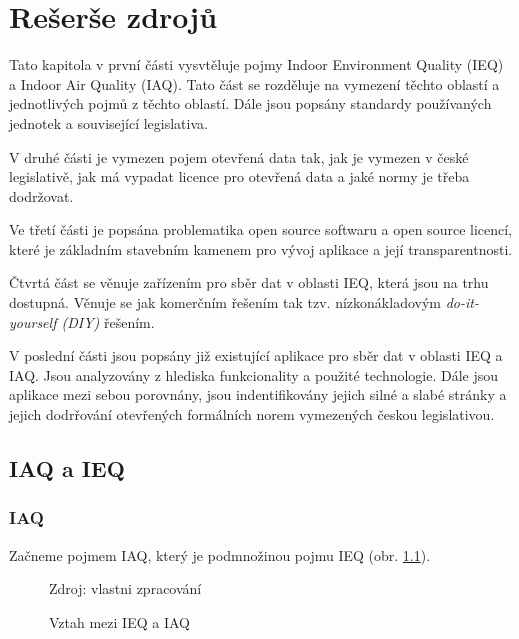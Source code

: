\chapter{Rešerše zdrojů}

Tato kapitola v první části vysvtěluje pojmy Indoor Environment Quality (IEQ) a Indoor Air Quality (IAQ). Tato část se rozděluje na vymezení těchto oblastí a jednotlivých pojmů z těchto oblastí. Dále jsou popsány standardy používaných jednotek a související legislativa. 

V druhé části je vymezen pojem otevřená data tak, jak je vymezen v české legislativě, jak má vypadat licence pro otevřená data a jaké normy je třeba dodržovat.

Ve třetí části je popsána problematika open source softwaru a open source licencí, které je základním stavebním kamenem pro vývoj aplikace a její transparentnosti.

Čtvrtá část se věnuje zařízením pro sběr dat v oblasti IEQ, která jsou na trhu dostupná. Věnuje se jak komerčním řešením tak tzv. nízkonákladovým \textit{do-it-yourself (DIY)} řešením.

V poslední části jsou popsány již existující aplikace pro sběr dat v oblasti IEQ a IAQ.
Jsou analyzovány z hlediska funkcionality a použité technologie. Dále jsou aplikace mezi sebou porovnány, jsou indentifikovány jejich silné a slabé stránky a jejich dodrřování otevřených formálních norem vymezených českou legislativou.  

\section{IAQ a IEQ}
\subsection{IAQ}
Začneme pojmem IAQ, který je podmnožinou pojmu IEQ (obr. \ref{obr01:vztah_ieq_a_iaq}).

\begin{figure}[htbp!]
  \caption{Vztah mezi IEQ a IAQ}
	\label{obr01:vztah_ieq_a_iaq}

	\centerfirst

\footnotesize Zdroj: vlastni zpracování
\end{figure}

